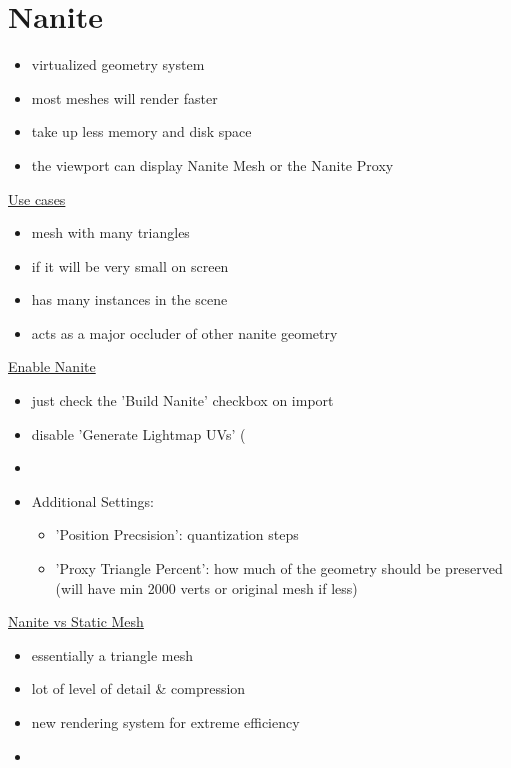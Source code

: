\chapter{Nanite}
    \begin{itemize}
        \item virtualized geometry system
        \item most meshes will render faster
        \item take up less memory and disk space
        \item the viewport can display Nanite Mesh or the Nanite Proxy
    \end{itemize}

    \uline{Use cases}
        \begin{itemize}
            \item mesh with many triangles
            \item if it will be very small on screen
            \item has many instances in the scene
            \item acts as a major occluder of other nanite geometry
        \end{itemize}

    \uline{Enable Nanite}
        \begin{itemize}
            \item just check the 'Build Nanite' checkbox on import
            \item disable 'Generate Lightmap UVs' (%
            \item 
            \item Additional Settings:
            \begin{itemize}
                \item 'Position Precsision': quantization steps
                \item 'Proxy Triangle Percent': how much of the geometry should be preserved (will have min 2000 verts or original mesh if less)
            \end{itemize}
        \end{itemize}

    \uline{Nanite vs Static Mesh}
        \begin{itemize}
            \item essentially a triangle mesh
            \item lot of level of detail \& compression
            \item new rendering system for extreme efficiency
            \item 
        \end{itemize}

